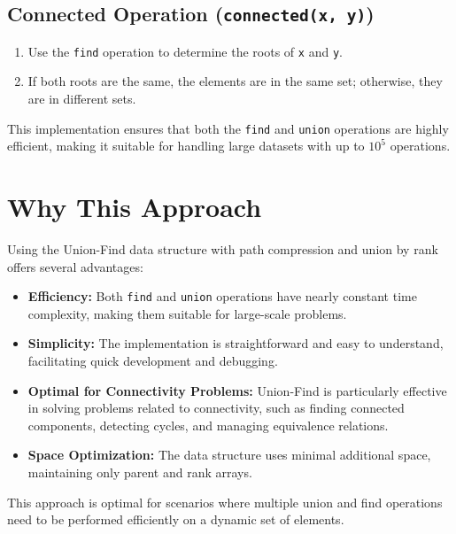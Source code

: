 \subsection*{Connected Operation (\texttt{connected(x, y)})}

\begin{enumerate}
    \item Use the \texttt{find} operation to determine the roots of \texttt{x} and \texttt{y}.
    \item If both roots are the same, the elements are in the same set; otherwise, they are in different sets.
\end{enumerate}

This implementation ensures that both the \texttt{find} and \texttt{union} operations are highly efficient, making it suitable for handling large datasets with up to \(10^5\) operations.

\section*{Why This Approach}

Using the Union-Find data structure with path compression and union by rank offers several advantages:

\begin{itemize}
    \item \textbf{Efficiency:}  
    Both \texttt{find} and \texttt{union} operations have nearly constant time complexity, making them suitable for large-scale problems.
    
    \item \textbf{Simplicity:}  
    The implementation is straightforward and easy to understand, facilitating quick development and debugging.
    
    \item \textbf{Optimal for Connectivity Problems:}  
    Union-Find is particularly effective in solving problems related to connectivity, such as finding connected components, detecting cycles, and managing equivalence relations.
    
    \item \textbf{Space Optimization:}  
    The data structure uses minimal additional space, maintaining only parent and rank arrays.
\end{itemize}

This approach is optimal for scenarios where multiple union and find operations need to be performed efficiently on a dynamic set of elements.

